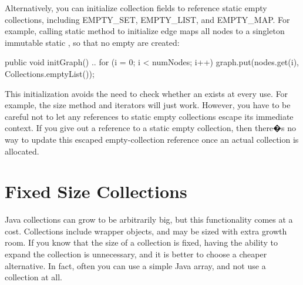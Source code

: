  Alternatively, you can initialize collection fields to reference static empty collections,
 including EMPTY\_SET,
 EMPTY\_LIST, and EMPTY\_MAP. For example, 
 calling static method  to initialize edge
  maps all nodes to a singleton immutable static
 , so that no empty  are created:
 \begin{shortlisting}
 public void initGraph() {
       ..
       for (i = 0; i < numNodes; i++) {
          graph.put(nodes.get(i), Collections.emptyList());
       }
   }
 \end{shortlisting}
This initialization avoids the need to check whether an 
exists at every use. For example, the size method and iterators will just work.
However, you have to be careful not to let any references to static empty
collections escape its immediate context. 
If you give out a reference to a static empty collection, 
then there�s no way to update this escaped empty-collection reference
once an actual collection is allocated. 

\section{Fixed Size Collections}

Java collections can grow to be
arbitrarily big, but this functionality comes at a cost.
Collections include wrapper objects, and 
may be sized with extra growth room. If
you know that the size of a collection is fixed, having the ability to expand
the collection is unnecessary, and it is better to choose a cheaper alternative.
In fact, often you can use a
simple Java array, and not use a collection at all.  

